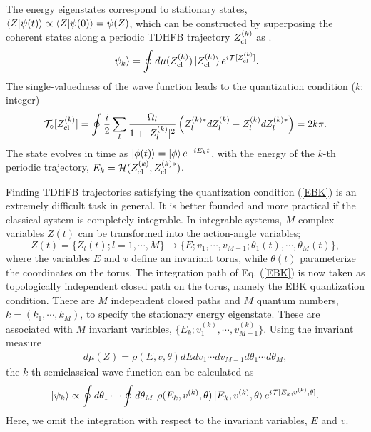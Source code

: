 \documentclass[%
superscriptaddress,
preprint,
showpacs,
nofootinbib,
amsmath,amssymb,
aps,
prc,
floatfix ]%
{revtex4-1}
\begin{document}
The energy eigenstates correspond to stationary states,
$\braket{Z|\psi(t)} \propto \braket{Z|\psi(0)}=\psi(Z)$,
which can be constructed by superposing the coherent states along
a periodic TDHFB trajectory $Z_{\rm cl}^{(k)}$ as \cite{KS80,K81,SM88}.
\begin{equation}
	\ket{\psi_k} = \oint d\mu(Z_{\rm cl}^{(k)}) \ket{Z_{\rm cl}^{(k)}}
	e^{i\mathcal{T}[Z_{\rm cl}^{(k)}]} .
\end{equation}
The single-valuedness of the wave function leads to
the quantization condition ($k$: integer)
\begin{equation}
	\mathcal{T}_\circ[Z_{\rm cl}^{(k)}]=
	\oint \frac{i}{2} \sum_l \frac{\Omega_l}{1+|Z_l^{(k)}|^2}
	\left(Z_l^{(k)*} dZ_l^{(k)} - Z_l^{(k)} dZ_l^{(k)*}\right) = 2k\pi .
	\label{EBK}
\end{equation}
The state evolves in time as $\ket{\phi(t)}=\ket{\phi}e^{-iE_k t}$,
with the energy of the $k$-th periodic trajectory,
$E_k=\mathcal{H}(Z_{\rm cl}^{(k)},Z_{\rm cl}^{(k)*})$.

Finding TDHFB trajectories satisfying the quantization condition
(\ref{EBK}) is an extremely difficult task in general.
It is better founded and more practical
if the classical system is completely integrable.
In integrable systems, $M$ complex variables $Z(t)$ can be transformed into
the action-angle variables;
\begin{equation}
	Z(t) = \{Z_l(t);l=1,\cdots,M \} \rightarrow
	\{E; v_1,\cdots,v_{M-1}; \theta_1(t),\cdots,\theta_M(t)\} ,
\end{equation}
where the variables $E$ and $v$ define an invariant torus,
while $\theta(t)$ parameterize the coordinates on the torus.
The integration path of Eq. (\ref{EBK}) is now taken as topologically
independent closed path on the torus,
namely the EBK quantization condition.
There are $M$ independent closed paths and $M$ quantum numbers,
$k=(k_1,\cdots,k_M)$, to specify the stationary energy eigenstate.
These are associated with $M$ invariant variables,
$\{E_k;v_1^{(k)},\cdots,v_{M-1}^{(k)}\}$.
Using the invariant measure
\begin{align}
  d\mu(Z) = \rho(E,v,\theta) dEdv_1\cdots dv_{M-1}d\theta_1\cdots d\theta_M,
\end{align}
the $k$-th semiclassical wave function can be calculated as
\begin{equation}
  \ket{\psi_k} \propto \oint d\theta_1\cdots \oint d\theta_M \ 
	\rho(E_k,v^{(k)},\theta)
	\ket{E_k,v^{(k)},\theta} e^{i\mathcal{T}[E_k,v^{(k)},\theta]} .
  \label{semi_wave_func}
\end{equation}
Here, we omit the integration with respect to the invariant variables,
$E$ and $v$.
\end{document}
